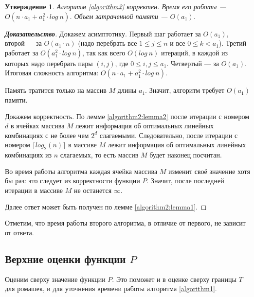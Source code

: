 \documentclass[12pt]{article}
\newtheorem{proposition}[theorem]{Утверждение}
\begin{document}
\begin{proposition}
Алгоритм \ref{algorithm2} корректен. Время его работы --- $O(n \cdot a_1 + a_1^2 \cdot log \ n)$. Объем затраченной памяти --- $O(a_1)$.
\end{proposition}
\begin{proof}[\textbf{Доказательство}]
Докажем асимптотику. Первый шаг работает за $O(a_1)$, второй --- за $O(a_1 \cdot n)$ (надо перебрать все $1 \le j \le n$ и все $0 \le k < a_1$). Третий работает за $O(a_1^2 \cdot log \ n)$, так как всего $O(log \ n)$ итераций, в каждой из которых надо перебрать пары $(i, j)$, где $0 \le i, j \le a_1$. Четвертый --- за $O(a_1)$. Итоговая сложность алгоритма: $O(n \cdot a_1 + a_1^2 \cdot log \ n)$.

Память тратится только на массив $M$ длины $a_1$. Значит, алгоритм требует $O(a_1)$ памяти.

Докажем корректность. По лемме \ref{algorithm2:lemma2} после итерации с номером $d$ в ячейках массива $M$ лежит информация об оптимальных линейных комбинациях с не более чем $2^d$ слагаемыми. Следовательно, после итерации с номером $\lceil log_2(n) \rceil$ в массиве $M$ лежит информация об оптимальных линейных комбинациях из $n$ слагаемых, то есть массив $M$ будет наконец посчитан.

Во время работы алгоритма каждая ячейка массива $M$ изменит своё значение хотя бы раз: это следует из корректности функции $P$. Значит, после последней итерации в массиве $M$ не останется $\infty$.

Далее ответ может быть получен по лемме \ref{algorithm2:lemma1}.
\end{proof}

Отметим, что время работы второго алгоритма, в отличие от первого, не зависит от ответа.

\subsection{Верхние оценки функции $P$}
Оценим сверху значение функции $P$. Это поможет и в оценке сверху границы $T$ для ромашек, и для уточнения времени работы алгоритма \ref{algorithm1}.
\end{document}
